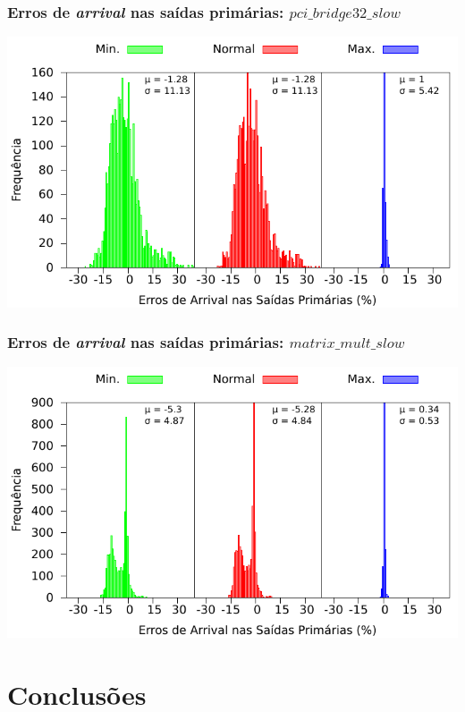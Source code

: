 \documentclass[10pt,a4paper]{beamer}
\begin{document}
		\begin{frame}[t]
			\frametitle{Erros de \textit{arrival} nas saídas primárias: $pci\_bridge32\_slow$}
			\begin{center}
				\includegraphics[width=0.9\linewidth]{img/arrival_error/pci_bridge32_puri.pdf}\\
			\end{center}
		\end{frame}		
		
		\begin{frame}[t]
			\frametitle{Erros de \textit{arrival} nas saídas primárias: $matrix\_mult\_slow$}
			\begin{center}
				\includegraphics[width=0.9\linewidth]{img/arrival_error/matrix_mult_puri.pdf}\\
			\end{center}
		\end{frame}
			
		
		
		
	
	\section{Conclusões}
	
\end{document}
